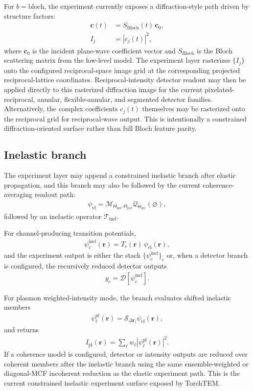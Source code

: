 \documentclass[11pt]{article}
\begin{document}
For $b=\text{bloch}$, the experiment currently exposes a diffraction-style path driven
by structure factors:
\begin{align}
  \mathbf{c}(t) &= S_{\mathrm{Bloch}}(t)\,\mathbf{c}_0, \\
  I_j &= |c_j(t)|^2,
\end{align}
where $\mathbf{c}_0$ is the incident plane-wave coefficient vector and
$S_{\mathrm{Bloch}}$ is the Bloch scattering matrix from the low-level model.  The
experiment layer rasterizes $\{I_j\}$ onto the configured reciprocal-space image grid
at the corresponding projected reciprocal-lattice coordinates.  Reciprocal-intensity
detector readout may then be applied directly to this rasterized diffraction image for
the current pixelated-reciprocal, annular, flexible-annular, and segmented detector
families.  Alternatively, the complex coefficients $c_j(t)$ themselves may be
rasterized onto the reciprocal grid for reciprocal-wave output. This is intentionally a
constrained diffraction-oriented surface rather than full Bloch feature parity.

\subsection{Inelastic branch}
The experiment layer may append a constrained inelastic branch after elastic
propagation, and this branch may also be followed by the current coherence-averaging
readout path:
\begin{align}
  \psi_{\mathrm{el}}
  = \mathcal{M}_{\Theta_{\mathrm{ms}},\Theta_{\mathrm{pot}}}
    \mathcal{Q}_{\Theta_{\mathrm{src}}}(\varnothing),
\end{align}
followed by an inelastic operator $\mathcal{T}_{\mathrm{inel}}$.

For channel-producing transition potentials,
\begin{align}
  \psi_c^{\mathrm{inel}}(\mathbf{r})
  = T_c(\mathbf{r}) \, \psi_{\mathrm{el}}(\mathbf{r}),
\end{align}
and the experiment output is either the stack $\{\psi_c^{\mathrm{inel}}\}_c$ or, when a
detector branch is configured, the recursively reduced detector outputs
\begin{align}
  y_c = \mathcal{D}\!\left[\psi_c^{\mathrm{inel}}\right].
\end{align}

For plasmon weighted-intensity mode, the branch evaluates shifted inelastic members
\begin{align}
  \psi_\ell^{\mathrm{pl}}(\mathbf{r})
  = \mathcal{S}_{\Delta \mathbf{r}_\ell}\psi_{\mathrm{el}}(\mathbf{r}),
\end{align}
and returns
\begin{align}
  I_{\mathrm{pl}}(\mathbf{r})
  = \sum_{\ell} w_\ell \left|\psi_\ell^{\mathrm{pl}}(\mathbf{r})\right|^2.
\end{align}
If a coherence model is configured, detector or intensity outputs are reduced over
coherent members after the inelastic branch using the same ensemble-weighted or
diagonal-MCF incoherent reduction as the elastic experiment path. This is the current
constrained inelastic experiment surface exposed by TorchTEM.
\end{document}
